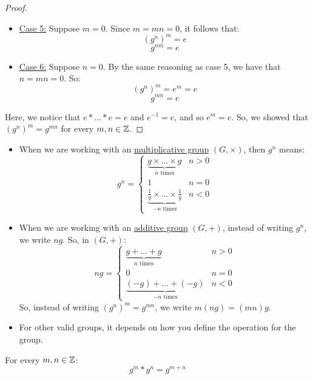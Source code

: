 \documentclass[letterpaper]{article}
\begin{document}
\begin{mdframed}
\begin{proof}
\begin{itemize}
            \item \underline{Case 5:} Suppose $m = 0$. Since $m = mn = 0$, it follows that: 
            \[(g^n)^m = e\]
            \[g^{nm} = e\]

            \item \underline{Case 6:} Suppose $n = 0$. By the same reasoning as case 5, we have that $n = mn = 0$. So: 
            \[(g^n)^m = e^m = e\]
            \[g^{mn} = e\]
        \end{itemize}

        Here, we notice that $e * \dots * e = e$ and $e^{-1} = e$, and so $e^m = e$. So, we showed that $(g^n)^m = g^{mn}$ for every $m, n \in \mathbb{Z}$. 
    \end{proof}
\end{mdframed}

\begin{note*}{}{}
    \begin{itemize}
        \item When we are working with an \underline{multiplicative group} $(G, \times)$, then $g^n$ means:
        \[g^n = \begin{cases}
            \underbrace{g \times \dots \times g}_{n \text{ times}} & n > 0 \\ 
            1 & n = 0 \\ 
            \underbrace{\frac{1}{g} \times \dots \times \frac{1}{g}}_{-n \text{ times}} & n < 0
        \end{cases}\]

        \item When we are working with an \underline{additive group} $(G, +)$, instead of writing $g^n$, we write $ng$. So, in $(G, +)$: 
        \[ng = \begin{cases}
            \underbrace{g + \dots + g}_{n \text{ times}} & n > 0 \\ 
            0 & n = 0 \\ 
            \underbrace{(-g) + \dots + (-g)}_{-n \text{ times}} & n < 0
        \end{cases}\]
        So, instead of writing $(g^{n})^m = g^{mn}$, we write $m(ng) = (mn)g$.

        \item For other valid groups, it depends on how you define the operation for the group. 
    \end{itemize}
\end{note*}

\begin{lemma}{}{}
    For every $m, n \in \mathbb{Z}$: 
    \[g^m * g^n = g^{m + n}\]
\end{lemma}
\end{document}
